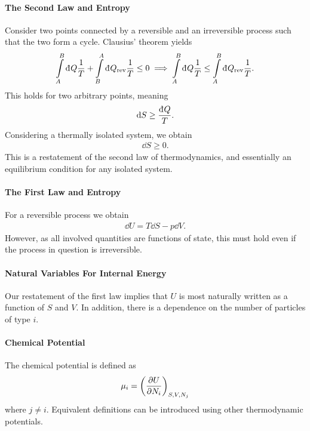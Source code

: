 \paragraph{The Second Law and Entropy}
Consider two points connected by a reversible and an irreversible process such that the two form a cycle. Clausius' theorem yields
\begin{align*}
	\intin{A}{B}{Q}{\frac{1}{T}} + \intin{B}{A}{Q_{\text{rev}}}{\frac{1}{T}} \leq 0 \implies \intin{A}{B}{Q}{\frac{1}{T}} \leq \intin{A}{B}{Q_{\text{rev}}}{\frac{1}{T}}.
\end{align*}
This holds for two arbitrary points, meaning
\begin{align*}
	\dd{S} \geq \frac{\din{Q}}{T}.
\end{align*}
Considering a thermally isolated system, we obtain
\begin{align*}
	\dd{S} \geq 0.
\end{align*}
This is a restatement of the second law of thermodynamics, and essentially an equilibrium condition for any isolated system.

\paragraph{The First Law and Entropy}
For a reversible process we obtain
\begin{align*}
	\dd{U} = T\dd{S} - p\dd{V}.
\end{align*}
However, as all involved quantities are functions of state, this must hold even if the process in question is irreversible.

\paragraph{Natural Variables For Internal Energy}
Our restatement of the first law implies that $U$ is most naturally written as a function of $S$ and $V$. In addition, there is a dependence on the number of particles of type $i$.


\paragraph{Chemical Potential}
The chemical potential is defined as
\begin{align*}
	\mu_{i} = \fix{\pdv{U}{N_{i}}}{S, V, N_{j}}
\end{align*}
where $j \neq i$. Equivalent definitions can be introduced using other thermodynamic potentials.

